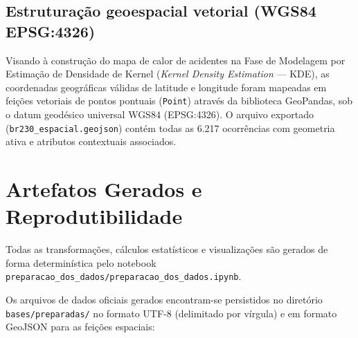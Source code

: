 \documentclass[11pt,a4paper]{article}
\begin{document}
\subsection{Estruturação geoespacial vetorial (WGS84 EPSG:4326)}

Visando à construção do mapa de calor de acidentes na Fase de Modelagem por Estimação de Densidade de Kernel (\textit{Kernel Density Estimation} --- KDE), as coordenadas geográficas válidas de latitude e longitude foram mapeadas em feições vetoriais de pontos pontuais (\texttt{Point}) através da biblioteca GeoPandas, sob o datum geodésico universal WGS84 (EPSG:4326). O arquivo exportado (\texttt{br230\_espacial.geojson}) contém todas as 6.217 ocorrências com geometria ativa e atributos contextuais associados.

\section{Artefatos Gerados e Reprodutibilidade}

Todas as transformações, cálculos estatísticos e visualizações são gerados de forma determinística pelo notebook \texttt{preparacao\_dos\_dados/}\allowbreak\texttt{preparacao\_dos\_dados.ipynb}.

\noindent
\begin{center}
\end{center}

Os arquivos de dados oficiais gerados encontram-se persistidos no diretório \texttt{bases/preparadas/} no formato UTF-8 (delimitado por vírgula) e em formato GeoJSON para as feições espaciais:
\end{document}
